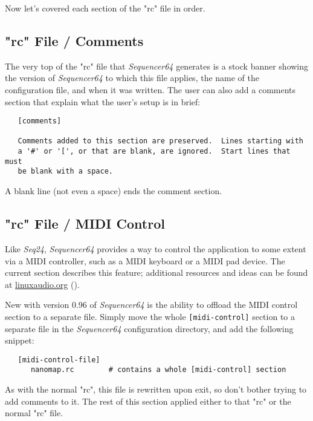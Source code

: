    Now let's covered each section of the "rc" file in order.

\subsection{"rc" File / Comments}
\label{subsec:seq64_rc_file_midi_comments}

   The very top of the "rc" file that \textsl{Sequencer64} generates is a stock
   banner showing the version of \textsl{Sequencer64} to which this file
   applies, the name of the configuration file, and when it was written.  The
   user can also add a comments section that explain what the user's setup is
   in brief:

   \begin{verbatim}
   [comments]

   Comments added to this section are preserved.  Lines starting with
   a '#' or '[', or that are blank, are ignored.  Start lines that must
   be blank with a space.
   \end{verbatim}

   A blank line (not even a space) ends the comment section.

\subsection{"rc" File / MIDI Control}
\label{subsec:seq64_rc_file_midi_control}

   Like \textsl{Seq24}, \textsl{Sequencer64} provides a way to control the
   application to some extent via a MIDI controller, such as a MIDI keyboard or
   a MIDI pad device.  The current section describes this feature;
   additional resources and ideas can be found at \url{linuxaudio.org}
   (\cite{midicontrol}).

   New with version 0.96 of \textsl{Sequencer64} is the ability
   to offload the MIDI control section to a separate file.  Simply move
   the whole \texttt{[midi-control]} section to a separate file in
   the \textsl{Sequencer64} configuration directory, and add the following
   snippet:

   \begin{verbatim}
   [midi-control-file]
      nanomap.rc        # contains a whole [midi-control] section
   \end{verbatim}

   As with the normal "rc", this file is rewritten upon exit, so
   don't bother trying to add comments to it.  The rest of this section
   applied either to that "rc" or the normal "rc" file.

